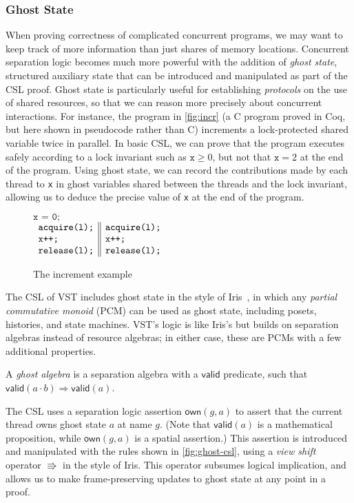 \subsubsection{Ghost State}
\label{ghost}
When proving correctness of complicated concurrent programs, we may want to keep track of more information than just shares of memory locations. Concurrent separation logic becomes much more powerful with the addition of \emph{ghost state}, structured auxiliary state that can be introduced and manipulated as part of the CSL proof. Ghost state is particularly useful for establishing \emph{protocols} on the use of shared resources, so that we can reason more precisely about concurrent interactions. For instance, the program in \autoref{fig:incr} (a C program proved in Coq, but here shown in pseudocode rather than C) increments a lock-protected shared variable twice in parallel. In basic CSL, we can prove that the program executes safely according to a lock invariant such as $\texttt{x} \ge 0$, but not that $\texttt{x} = 2$ at the end of the program. Using ghost state, we can record the contributions made by each thread to \texttt{x} in ghost variables shared between the threads and the lock invariant, allowing us to deduce the precise value of \texttt{x} at the end of the program.

\begin{figure}[htb]
\centering
$\texttt{x = 0;}$\\
$\begin{array}{l || l}
\texttt{acquire(l);} & \texttt{acquire(l);}\\
\texttt{x++;} & \texttt{x++;}\\
\texttt{release(l);} & \texttt{release(l);}
\end{array}$
\caption{The increment example}
\label{fig:incr}
\end{figure}

The CSL of VST includes ghost state in the style of Iris~\cite{jung2015iris}, in which any \emph{partial commutative monoid} (PCM) can be used as ghost state, including posets, histories, and state machines.
VST's logic is like Iris's but
builds on separation algebras instead of resource algebras;
in either case, these are PCMs with a few additional properties.
\begin{definition}A \emph{ghost algebra} is a separation algebra with a $\mathsf{valid}$  predicate, such that\newline $\mathsf{valid}(a \cdot b) \Rightarrow \mathsf{valid}(a)$.\end{definition}
The CSL uses a separation logic assertion $\mathsf{own}(g, a)$ to assert that the current thread owns ghost state $a$ at name $g$. (Note that $\mathsf{valid}(a)$ is a mathematical proposition, while $\mathsf{own}(g, a)$ is a spatial assertion.) This assertion is introduced and manipulated with the rules shown in \autoref{fig:ghost-csl}, using a \emph{view shift} operator $\Rrightarrow$ in the style of Iris. This operator subsumes logical implication, and allows us to make frame-preserving updates to ghost state at any point in a proof.

